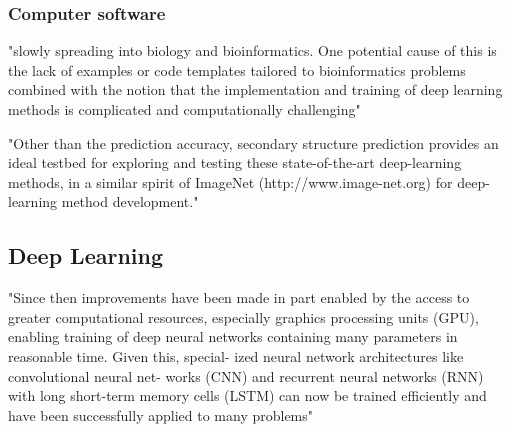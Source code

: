 \documentclass[]{scrartcl}
\begin{document}
\subsubsection{Computer software}
"slowly spreading into biology and bioinformatics. One potential cause of this is the lack of examples or code templates tailored to bioinformatics problems combined with the notion that the implementation and training of deep learning methods is complicated and computationally challenging" \cite{Jurtz2017}

"Other than the prediction accuracy, secondary structure prediction provides an ideal testbed for exploring and testing these state-of-the-art deep-learning methods, in a similar spirit of ImageNet (http://www.image-net.org) for deep-learning method development." \cite{Fang2017}

\subsection{Deep Learning}
"Since then improvements have been made in part enabled by the access to greater computational resources, especially graphics processing units (GPU), enabling training of deep neural networks containing many parameters in reasonable time. Given this, special- ized neural network architectures like convolutional neural net- works (CNN) and recurrent neural networks (RNN) with long short-term memory cells (LSTM) can now be trained efficiently and have been successfully applied to many problems" \cite{Jurtz2017}
\end{document}
